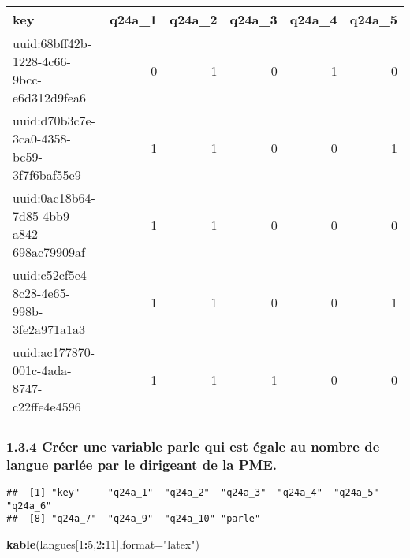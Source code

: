 \documentclass[
]{article}
\newenvironment{Shaded}{\begin{snugshade}}{\end{snugshade}}
\newcommand{\AttributeTok}[1]{\textcolor[rgb]{0.13,0.29,0.53}{#1}}
\newcommand{\DecValTok}[1]{\textcolor[rgb]{0.00,0.00,0.81}{#1}}
\newcommand{\FunctionTok}[1]{\textcolor[rgb]{0.13,0.29,0.53}{\textbf{#1}}}
\newcommand{\NormalTok}[1]{#1}
\newcommand{\OtherTok}[1]{\textcolor[rgb]{0.56,0.35,0.01}{#1}}
\newcommand{\SpecialCharTok}[1]{\textcolor[rgb]{0.81,0.36,0.00}{\textbf{#1}}}
\newcommand{\StringTok}[1]{\textcolor[rgb]{0.31,0.60,0.02}{#1}}
\begin{document}
\begin{tabular}{l|r|r|r|r|r}
\hline
key & q24a\_1 & q24a\_2 & q24a\_3 & q24a\_4 & q24a\_5\\
\hline
uuid:68bff42b-1228-4c66-9bcc-e6d312d9fea6 & 0 & 1 & 0 & 1 & 0\\
\hline
uuid:d70b3c7e-3ca0-4358-bc59-3f7f6baf55e9 & 1 & 1 & 0 & 0 & 1\\
\hline
uuid:0ac18b64-7d85-4bb9-a842-698ac79909af & 1 & 1 & 0 & 0 & 0\\
\hline
uuid:c52cf5e4-8c28-4e65-998b-3fe2a971a1a3 & 1 & 1 & 0 & 0 & 1\\
\hline
uuid:ac177870-001c-4ada-8747-c22ffe4e4596 & 1 & 1 & 1 & 0 & 0\\
\hline
\end{tabular}

\hypertarget{cruxe9er-une-variable-parle-qui-est-uxe9gale-au-nombre-de-langue-parluxe9e-par-le-dirigeant-de-la-pme.}{%
\subsubsection{1.3.4 Créer une variable parle qui est égale au nombre de
langue parlée par le dirigeant de la
PME.}\label{cruxe9er-une-variable-parle-qui-est-uxe9gale-au-nombre-de-langue-parluxe9e-par-le-dirigeant-de-la-pme.}}

\begin{Shaded}
\end{Shaded}

\begin{verbatim}
##  [1] "key"     "q24a_1"  "q24a_2"  "q24a_3"  "q24a_4"  "q24a_5"  "q24a_6" 
##  [8] "q24a_7"  "q24a_9"  "q24a_10" "parle"
\end{verbatim}

\begin{Shaded}
\begin{Highlighting}[]
\FunctionTok{kable}\NormalTok{(langues[}\DecValTok{1}\SpecialCharTok{:}\DecValTok{5}\NormalTok{,}\DecValTok{2}\SpecialCharTok{:}\DecValTok{11}\NormalTok{],}\AttributeTok{format=}\StringTok{"latex"}\NormalTok{)}
\end{Highlighting}
\end{Shaded}
\end{document}
